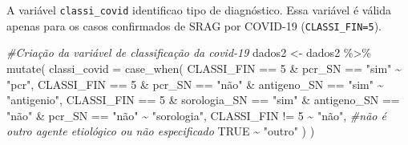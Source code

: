 \documentclass[
]{article}
\newenvironment{Shaded}{\begin{snugshade}}{\end{snugshade}}
\newcommand{\AttributeTok}[1]{\textcolor[rgb]{0.77,0.63,0.00}{#1}}
\newcommand{\CommentTok}[1]{\textcolor[rgb]{0.56,0.35,0.01}{\textit{#1}}}
\newcommand{\ConstantTok}[1]{\textcolor[rgb]{0.00,0.00,0.00}{#1}}
\newcommand{\DecValTok}[1]{\textcolor[rgb]{0.00,0.00,0.81}{#1}}
\newcommand{\FunctionTok}[1]{\textcolor[rgb]{0.00,0.00,0.00}{#1}}
\newcommand{\NormalTok}[1]{#1}
\newcommand{\OtherTok}[1]{\textcolor[rgb]{0.56,0.35,0.01}{#1}}
\newcommand{\SpecialCharTok}[1]{\textcolor[rgb]{0.00,0.00,0.00}{#1}}
\newcommand{\StringTok}[1]{\textcolor[rgb]{0.31,0.60,0.02}{#1}}
\begin{document}
A variável \texttt{classi\_covid} identificao tipo de diagnóstico. Essa
variável é válida apenas para os casos confirmados de SRAG por COVID-19
(\texttt{CLASSI\_FIN=5}).

\begin{Shaded}
\begin{Highlighting}[]
\CommentTok{\#Criação da variável de classificação da covid{-}19}
\NormalTok{dados2 }\OtherTok{\textless{}{-}}\NormalTok{ dados2 }\SpecialCharTok{\%\textgreater{}\%}
  \FunctionTok{mutate}\NormalTok{(}
    \AttributeTok{classi\_covid =} \FunctionTok{case\_when}\NormalTok{(}
\NormalTok{      CLASSI\_FIN }\SpecialCharTok{==} \DecValTok{5} \SpecialCharTok{\&}\NormalTok{ pcr\_SN }\SpecialCharTok{==} \StringTok{"sim"}  \SpecialCharTok{\textasciitilde{}} \StringTok{"pcr"}\NormalTok{,}
\NormalTok{      CLASSI\_FIN }\SpecialCharTok{==} \DecValTok{5} \SpecialCharTok{\&}\NormalTok{ pcr\_SN }\SpecialCharTok{==} \StringTok{"não"} \SpecialCharTok{\&}
\NormalTok{        antigeno\_SN }\SpecialCharTok{==} \StringTok{"sim"} \SpecialCharTok{\textasciitilde{}} \StringTok{"antigenio"}\NormalTok{,}
\NormalTok{      CLASSI\_FIN }\SpecialCharTok{==} \DecValTok{5} \SpecialCharTok{\&}\NormalTok{ sorologia\_SN }\SpecialCharTok{==} \StringTok{"sim"} \SpecialCharTok{\&}
\NormalTok{        antigeno\_SN }\SpecialCharTok{==} \StringTok{"não"} \SpecialCharTok{\&}
\NormalTok{        pcr\_SN }\SpecialCharTok{==} \StringTok{"não"} \SpecialCharTok{\textasciitilde{}} \StringTok{"sorologia"}\NormalTok{,}
\NormalTok{      CLASSI\_FIN }\SpecialCharTok{!=} \DecValTok{5} \SpecialCharTok{\textasciitilde{}} \StringTok{"não"}\NormalTok{, }\CommentTok{\#não é outro agente etiológico ou não especificado}
      \ConstantTok{TRUE} \SpecialCharTok{\textasciitilde{}} \StringTok{"outro"}
\NormalTok{    )}
\NormalTok{  )}
\end{Highlighting}
\end{Shaded}

\begin{Shaded}
\end{Shaded}
\end{document}
